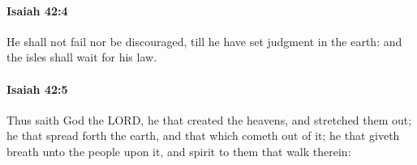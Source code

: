 		\paragraph{Isaiah 42:4} %
			\label{ISAIAH-42-4}

			He shall not fail nor be discouraged, till he have set judgment in the earth: and the isles shall wait for his law.


		\paragraph{Isaiah 42:5} %
			\label{ISAIAH-42-5}

			Thus saith God the LORD, he that created the heavens, and stretched them out; he that spread forth the earth, and that which cometh out of it; he that giveth breath unto the people upon it, and spirit to them that walk therein:


